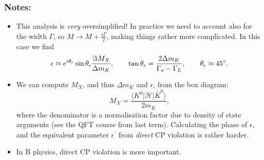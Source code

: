 \subsubsection{Notes:}
\begin{itemize}
\item This analysis is \textit{very} oversimplified! In practice we need to account also for the width $\Gamma$, so $M\to M + \frac{i\Gamma}{2}$, making things rather more complicated. In this case we find
\begin{equation}
\epsilon \approx e^{i\theta_\epsilon}\sin\theta_\epsilon \frac{\Im M_X}{\Delta m_K}, \qquad \tan\theta_\epsilon = \frac{2\Delta m_K}{\Gamma_s - \Gamma_L}, \qquad \theta_\epsilon \approx 45 \degree.
\end{equation}
\item We can compute $M_X$, and thus $\Delta m_K$ and $\epsilon$, from the box diagram:
\begin{equation}
M_X = \frac{\langle K^0 | \mathcal{H} | \bar{K}^0 \rangle}{2m_K},
\end{equation}
where the denominator is a normalisation factor due to density of state arguments (see the QFT course from last term). Calculating the phase of $\epsilon$, and the equivalent parameter $\epsilon^\prime$ from \textit{direct} CP violation is rather harder.
\item In B physics, direct CP violation is more important.
\end{itemize}
%
